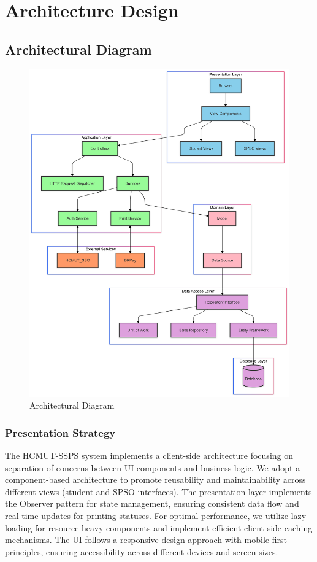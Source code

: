 \chapter{Architecture Design}

\section{Architectural Diagram}

\begin{figure}[H]
    \centering
    \includegraphics[width=0.78\linewidth]{images/architectural_diagram.png}
    \caption{Architectural Diagram}
    \label{fig:enter-label}
\end{figure}

\subsection{Presentation Strategy} 

The HCMUT-SSPS system implements a client-side architecture focusing on separation of concerns between UI components and business logic. We adopt a component-based architecture to promote reusability and maintainability across different views (student and SPSO interfaces). The presentation layer implements the Observer pattern for state management, ensuring consistent data flow and real-time updates for printing statuses. For optimal performance, we utilize lazy loading for resource-heavy components and implement efficient client-side caching mechanisms. The UI follows a responsive design approach with mobile-first principles, ensuring accessibility across different devices and screen sizes.

